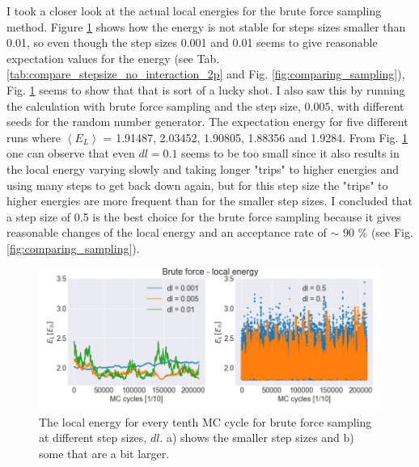 I took a closer look at the actual local energies for the brute force sampling method. Figure \ref{fig:local_energy_step_size_brute_force} shows how the energy is not stable for steps sizes smaller than 0.01, so even though the step sizes 0.001 and 0.01 seems to give reasonable expectation values for the energy (see Tab. \ref{tab:compare_stepsize_no_interaction_2p} and Fig. \ref{fig:comparing_sampling}), Fig. \ref{fig:local_energy_step_size_brute_force} seems to show that that is sort of a lucky shot. I also saw this by running the calculation with brute force sampling and the step size, $0.005$, with different seeds for the random number generator. The expectation energy for five different runs where $\left< E_L \right>$ =  1.91487, 2.03452, 1.90805, 1.88356 and 1.9284. From Fig. \ref{fig:local_energy_step_size_brute_force} one can observe that even $dl=0.1$ seems to be too small since it also results in the local energy varying slowly and taking longer "trips" to higher energies and using many steps to get back down again, but for this step size the "trips" to higher energies are more frequent than for the smaller step sizes. I concluded that a step size of 0.5 is the best choice for the brute force sampling because it gives reasonable changes of the local energy and an acceptance rate of $\sim$ 90 \% (see Fig. \ref{fig:comparing_sampling}). 

\begin{figure}[H]
\center
\includegraphics[width=0.85\linewidth]{../Results/local_energy_step_sizes}\caption{The local energy for every tenth MC cycle for brute force sampling at different step sizes, $dl$. a) shows the smaller step sizes and b) some that are a bit larger.}\label{fig:local_energy_step_size_brute_force}
\end{figure}

%

